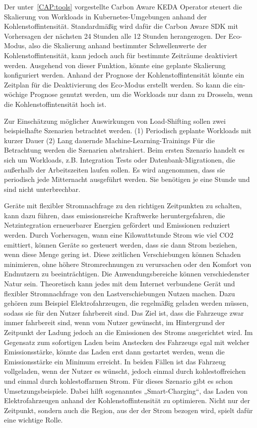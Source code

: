 Der unter~\ref{CAP:tools} vorgestellte Carbon Aware \ac{KEDA} Operator steuert die Skalierung von Workloads in Kubernetes-Umgebungen anhand der Kohlenstoffintensität.
Standardmäßig wird dafür die Carbon Aware SDK mit Vorhersagen der nächsten 24 Stunden alle 12 Stunden herangezogen.
Der Eco-Modus, also die Skalierung anhand bestimmter Schwellenwerte der Kohlenstoffintensität, kann jedoch auch für bestimmte Zeiträume deaktiviert werden.
Ausgehend von dieser Funktion, könnte eine geplante Skalierung konfiguriert werden.
Anhand der Prognose der Kohlenstoffintensität könnte ein Zeitplan für die Deaktivierung des Eco-Modus erstellt werden.
So kann die ein-wöchige Prognose genutzt werden, um die Workloads nur dann zu Drosseln, wenn die Kohlenstoffintensität hoch ist.

Zur Einschätzung möglicher Auswirkungen von Load-Shifting sollen zwei beispielhafte Szenarien betrachtet werden.
(1) Periodisch geplante Workloads mit kurzer Dauer
(2) Lang dauernde Machine-Learning-Trainings
Für die Betrachtung werden die Szenarien abstrahiert.
Beim ersten Szenario handelt es sich um Workloads, z.B. Integration Tests oder Datenbank-Migrationen, die außerhalb der Arbeitszeiten laufen sollen.
Es wird angenommen, dass sie periodisch jede Mitternacht ausgeführt werden.
Sie benötigen je eine Stunde und sind nicht unterbrechbar.


Geräte mit flexibler Stromnachfrage zu den richtigen Zeitpunkten zu schalten, kann dazu führen, dass emissionsreiche Kraftwerke heruntergefahren, die Netzintegration erneuerbarer Energien gefördert und Emissionen reduziert werden.
Durch Vorhersagen, wann eine Kilowattstunde Strom wie viel CO2 emittiert, können Geräte so gesteuert werden, dass sie dann Strom beziehen, wenn diese Menge gering ist.
Diese zeitlichen Verschiebungen können Schaden minimieren, ohne höhere Stromrechnungen zu verursachen oder den Komfort von Endnutzern zu beeinträchtigen.
Die Anwendungsbereiche können verschiedenster Natur sein.
Theoretisch kann jedes mit dem Internet verbundene Gerät und flexibler Stromnachfrage von den Lastverschiebungen Nutzen machen.
Dazu gehören zum Beispiel Elektrofahrzeugen, die regelmäßig geladen werden müssen, sodass sie für den Nutzer fahrbereit sind.
Das Ziel ist, dass die Fahrzeuge zwar immer fahrbereit sind, wenn vom Nutzer gewünscht, im Hintergrund der Zeitpunkt der Ladung jedoch an die Emissionen des Stroms ausgerichtet wird.
Im Gegensatz zum sofortigen Laden beim Anstecken des Fahrzeugs egal mit welcher Emissionsstärke, könnte das Laden erst dann gestartet werden, wenn die Emissionsstärke ein Minimum erreicht.
In beiden Fällen ist das Fahrzeug vollgeladen, wenn der Nutzer es wünscht, jedoch einmal durch kohlestoffreichen und einmal durch kohlestoffarmen Strom.
Für dieses Szenario gibt es schon Umsetzungsbeispiele.
Dabei hilft sogenanntes „Smart-Charging“, das Laden von Elektrofahrzeugen anhand der Kohlenstoffintensität zu optimieren.
Nicht nur der Zeitpunkt, sondern auch die Region, aus der der Strom bezogen wird, spielt dafür eine wichtige Rolle.

